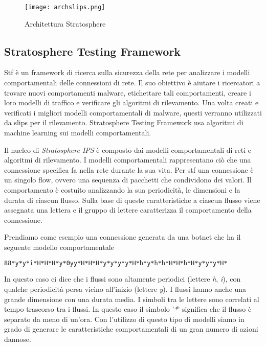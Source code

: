 \documentclass[../main.tex]{subfiles}
\begin{document}
\begin{figure}[H]
\centering
\texttt{[image: archslips.png]}
\caption{Architettura Stratosphere}
\label{fig:architetturaStratosphere}
\end{figure}



\subsection{Stratosphere Testing Framework}
Stf è un framework di ricerca sulla sicurezza della rete per analizzare i modelli comportamentali delle connessioni di rete. Il suo obiettivo è aiutare i ricercatori a trovare nuovi comportamenti malware, etichettare tali comportamenti, creare i loro modelli di traffico e verificare gli algoritmi di rilevamento. Una volta creati e verificati i migliori modelli comportamentali di malware, questi verranno utilizzati da slips per il rilevamento. Stratosphere Testing Framework usa algoritmi di machine learning sui modelli comportamentali.

Il nucleo di \textit{Stratosphere IPS} è composto dai modelli comportamentali di reti e algoritmi di rilevamento. I modelli comportamentali rappresentano ciò che una connessione specifica fa nella rete durante la sua vita. Per stf una connessione è un singolo flow, ovvero una sequenza di pacchetti che condividono dei valori. Il comportamento è costuito analizzando la sua periodicità, le dimensioni e la durata di ciascun flusso. Sulla base di queste caratteristiche a ciascun flusso viene assegnata una lettera e il gruppo di lettere caratterizza il comportamento della connessione.

Prendiamo come esempio una connessione generata da una botnet che ha il seguente modello comportamentale
\begin{lstlisting}[language=bash]
88*y*y*i*H*H*H*y*0yy*H*H*H*y*y*y*y*H*h*y*h*h*H*H*h*H*y*y*y*H*
\end{lstlisting}

In questo caso ci dice che i flussi sono altamente periodici (lettere \textit{h}, \textit{i}), con qualche periodicità persa vicino all'inizio (lettere \textit{y}). I flussi hanno anche una grande dimensione con una durata media. I simboli tra le lettere sono correlati al tempo trascorso tra i flussi. In questo caso il simbolo '\textit{*}' significa che il flusso è separato da meno di un'ora.
Con l'utilizzo di questo tipo di modelli siamo in grado di generare le caratteristiche comportamentali di un gran numero di azioni dannose. 
\end{document}
